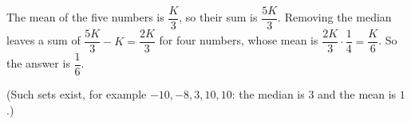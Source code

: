 The mean of the five numbers is $\dfrac {K}{3}$, so their sum is $\dfrac{5K}{3}$. Removing the median leaves a sum of $\dfrac{5K}{3}-K=\dfrac{2K}{3}$ for four numbers, whose mean is $\dfrac{2K}{3}\cdot\dfrac{1}{4}=\dfrac {K}{6}$. So the answer is $\boxed{\dfrac{1}{6}}$.

(Such sets exist, for example $-10,-8,3,10,10$: the median is $3$ and the mean is $1$.)
